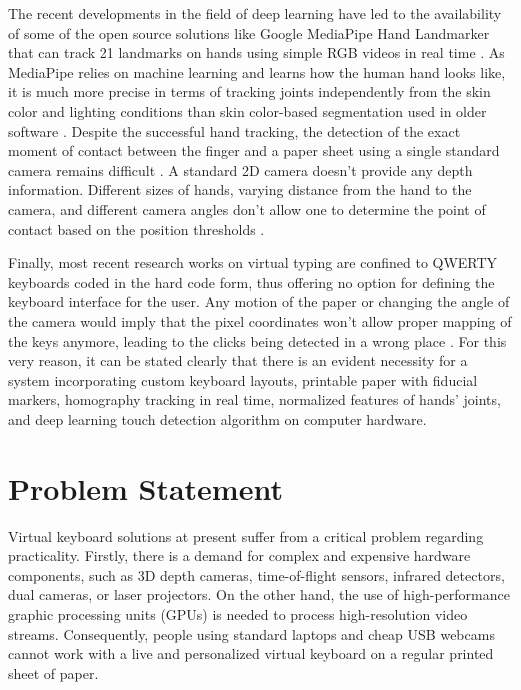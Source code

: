 The recent developments in the field of deep learning have led to the availability of some of the open source solutions like Google MediaPipe Hand Landmarker that can track 21 landmarks on hands using simple RGB videos in real time \cite{Zhang2020MediaPipe, Sreenath2021Monocular, GilMartin2023Hand, Ivacko2024Edge, Andriyanov2025Improving}. As MediaPipe relies on machine learning and learns how the human hand looks like, it is much more precise in terms of tracking joints independently from the skin color and lighting conditions than skin color-based segmentation used in older software \cite{SanchezBrizuela2023Lightweight}. Despite the successful hand tracking, the detection of the exact moment of contact between the finger and a paper sheet using a single standard camera remains difficult \cite{Li2021CNN, Lee2022Virtual}. A standard 2D camera doesn't provide any depth information. Different sizes of hands, varying distance from the hand to the camera, and different camera angles don't allow one to determine the point of contact based on the position thresholds \cite{Maman2023TypeNet, Yoo2026WordLevel}.

Finally, most recent research works on virtual typing are confined to QWERTY keyboards coded in the hard code form, thus offering no option for defining the keyboard interface for the user. Any motion of the paper or changing the angle of the camera would imply that the pixel coordinates won’t allow proper mapping of the keys anymore, leading to the clicks being detected in a wrong place \cite{Wang2016AprilTag2, Kallwies2020Determining, Shabalina2018ARTag, Kalaitzakis2021Fiducial, Pirchheim2011Homography, Zhang2022DynaKey}. For this very reason, it can be stated clearly that there is an evident necessity for a system incorporating custom keyboard layouts, printable paper with fiducial markers, homography tracking in real time, normalized features of hands’ joints, and deep learning touch detection algorithm on computer hardware.


\section{Problem Statement}
\label{sec:problem_statement}
Virtual keyboard solutions at present suffer from a critical problem regarding practicality. Firstly, there is a demand for complex and expensive hardware components, such as 3D depth cameras, time-of-flight sensors, infrared detectors, dual cameras, or laser projectors. On the other hand, the use of high-performance graphic processing units (GPUs) is needed to process high-resolution video streams. Consequently, people using standard laptops and cheap USB webcams cannot work with a live and personalized virtual keyboard on a regular printed sheet of paper.

